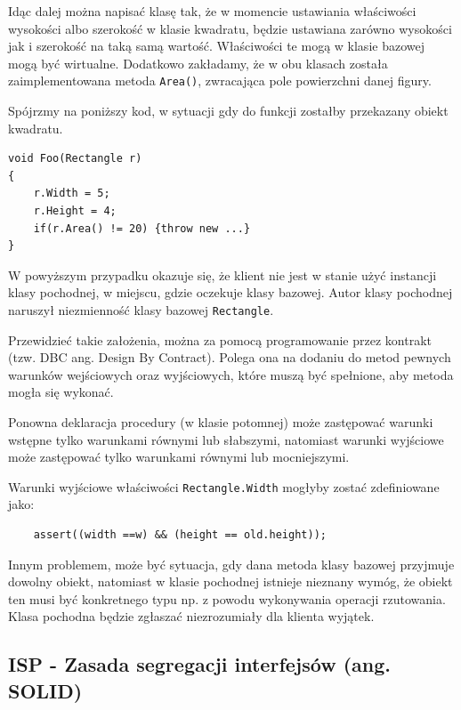 Idąc dalej można napisać klasę tak, że w momencie ustawiania właściwości wysokości albo szerokość w klasie kwadratu, będzie ustawiana zarówno wysokości jak i szerokość na taką samą wartość. Właściwości te mogą w klasie bazowej mogą być wirtualne. Dodatkowo zakładamy, że w obu klasach została zaimplementowana metoda \texttt{Area()}, zwracająca pole powierzchni danej figury.

Spójrzmy na poniższy kod, w sytuacji gdy do funkcji zostałby przekazany obiekt kwadratu.
\begin{lstlisting}[caption={Naruszenie zasady LSP}, label={lab1/lst/lspViolationSquareRectangle}]
void Foo(Rectangle r)
{
	r.Width = 5;
	r.Height = 4;
	if(r.Area() != 20) {throw new ...}
}
\end{lstlisting}

W powyższym przypadku okazuje się, że klient nie jest w stanie użyć instancji klasy pochodnej, w miejscu, gdzie oczekuje klasy bazowej. Autor klasy pochodnej naruszył niezmienność klasy bazowej \texttt{Rectangle}.


Przewidzieć takie założenia, można za pomocą  programowanie przez kontrakt (tzw. DBC ang. Design By Contract). Polega ona na dodaniu do metod pewnych warunków wejściowych oraz wyjściowych, które muszą być spełnione, aby metoda mogła się wykonać. 

\begin{tcolorbox}[colback=yellow]	
Ponowna deklaracja procedury (w klasie potomnej) może zastępować warunki wstępne tylko warunkami równymi lub słabszymi, natomiast warunki wyjściowe może zastępować tylko warunkami równymi lub mocniejszymi.
\end{tcolorbox}

Warunki wyjściowe właściwości \texttt{Rectangle.Width} mogłyby zostać zdefiniowane jako:
\begin{lstlisting}
	assert((width ==w) && (height == old.height));
\end{lstlisting}

Innym problemem, może być sytuacja, gdy dana metoda klasy bazowej przyjmuje dowolny obiekt, natomiast w klasie pochodnej istnieje nieznany wymóg, że obiekt ten musi być konkretnego typu np. z powodu wykonywania operacji rzutowania. Klasa pochodna będzie zgłaszać niezrozumiały dla klienta wyjątek.

\subsection{ISP - Zasada segregacji interfejsów (ang. SOL\textbf{I}D)}

